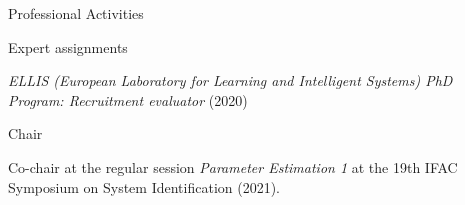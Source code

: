\documentclass{resume} %
\begin{document}
\begin{rSection}{Professional Activities}
\begin{rSubsection}{Expert assignments}{}{}

\item \hspace{3pt}
{\em ELLIS (European Laboratory for Learning and Intelligent Systems) PhD Program: Recruitment evaluator} (2020)

\end{rSubsection}

\begin{rSubsection}{Chair}{}{}

\item \hspace{3pt} Co-chair at the regular session  \textit{Parameter Estimation 1} at the 19th IFAC Symposium on System Identification (2021).
\end{rSubsection}


\end{rSection}


\end{document}
